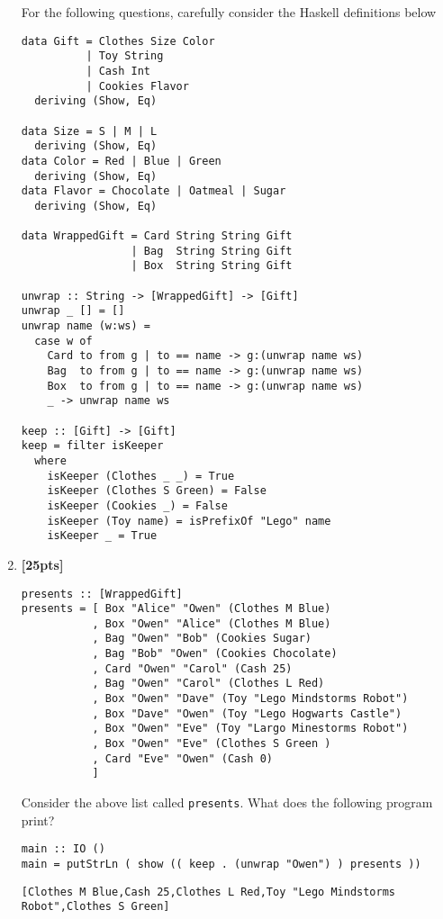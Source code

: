 \documentclass[paper=letter, fontsize=13pt]{article} %
\numberwithin{equation}{section} %
\newif\ifshowanswers\showanswerstrue
\begin{document}
\begin{enumerate}
\newpage

For the following questions, carefully consider the Haskell definitions below
\begin{lstlisting}
data Gift = Clothes Size Color
          | Toy String
          | Cash Int
          | Cookies Flavor
  deriving (Show, Eq)

data Size = S | M | L
  deriving (Show, Eq)
data Color = Red | Blue | Green
  deriving (Show, Eq)
data Flavor = Chocolate | Oatmeal | Sugar
  deriving (Show, Eq)

data WrappedGift = Card String String Gift
                 | Bag  String String Gift
                 | Box  String String Gift

unwrap :: String -> [WrappedGift] -> [Gift]
unwrap _ [] = []
unwrap name (w:ws) = 
  case w of
    Card to from g | to == name -> g:(unwrap name ws)
    Bag  to from g | to == name -> g:(unwrap name ws)
    Box  to from g | to == name -> g:(unwrap name ws)
    _ -> unwrap name ws

keep :: [Gift] -> [Gift]
keep = filter isKeeper
  where
    isKeeper (Clothes _ _) = True
    isKeeper (Clothes S Green) = False
    isKeeper (Cookies _) = False
    isKeeper (Toy name) = isPrefixOf "Lego" name
    isKeeper _ = True
\end{lstlisting}

\newpage
\item \textbf{[25pts]}
\begin{lstlisting}
presents :: [WrappedGift]
presents = [ Box "Alice" "Owen" (Clothes M Blue)
           , Box "Owen" "Alice" (Clothes M Blue)
           , Bag "Owen" "Bob" (Cookies Sugar)
           , Bag "Bob" "Owen" (Cookies Chocolate)
           , Card "Owen" "Carol" (Cash 25)
           , Bag "Owen" "Carol" (Clothes L Red)
           , Box "Owen" "Dave" (Toy "Lego Mindstorms Robot")
           , Box "Dave" "Owen" (Toy "Lego Hogwarts Castle")
           , Box "Owen" "Eve" (Toy "Largo Minestorms Robot")
           , Box "Owen" "Eve" (Clothes S Green )
           , Card "Eve" "Owen" (Cash 0)
           ]
\end{lstlisting}
  Consider the above list called \verb|presents|.  What does the following program print?
\begin{lstlisting}
main :: IO ()
main = putStrLn ( show (( keep . (unwrap "Owen") ) presents ))
\end{lstlisting}

\ifshowanswers
\verb|[Clothes M Blue,Cash 25,Clothes L Red,Toy "Lego Mindstorms Robot",Clothes S Green]|
\else
  \framebox[0.9\textwidth]{\begin{minipage}[t][30em]{0.9\textwidth} \end{minipage}}
\fi


\end{enumerate}
\end{document}
